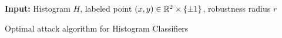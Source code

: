 
\begin{algorithm}[H]
    \SetAlgoLined
    {\bfseries Input:} Histogram $H$, labeled point $(x,y) \in \mathbb R^2 \times \{\pm 1\}$, robustness radius $r$\;
    
    

\caption{Optimal attack algorithm for Histogram Classifiers}\label{alg_hist_attack}
\end{algorithm}
 
